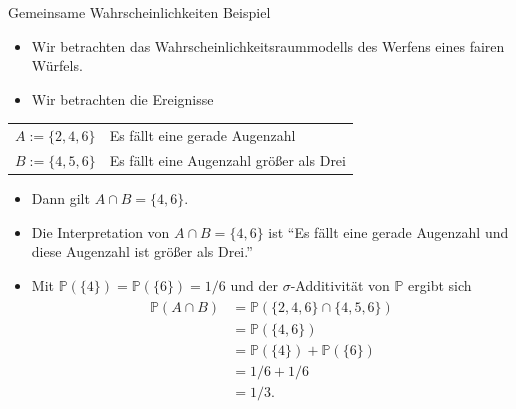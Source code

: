 \documentclass[
  8pt,
  ignorenonframetext,
]{beamer}
\providecommand{\tightlist}{%
  \setlength{\itemsep}{0pt}\setlength{\parskip}{0pt}}
\begin{document}
\begin{frame}{Gemeinsame Wahrscheinlichkeiten}
\protect\hypertarget{gemeinsame-wahrscheinlichkeiten-1}{}
Beispiel

\small

\begin{itemize}
\item
  Wir betrachten das Wahrscheinlichkeitsraummodells des Werfens eines
  fairen Würfels.
\item
  Wir betrachten die Ereignisse
\end{itemize}

\begin{center}
\begin{tabular}{ll}
$A := \{2,4,6\}$ & Es fällt eine gerade Augenzahl              \\
$B := \{4,5,6\}$ & Es fällt eine Augenzahl größer als Drei     \\
\end{tabular}
\end{center}

\begin{itemize}
\item
  Dann gilt \(A \cap B = \{4,6\}\).
\item
  Die Interpretation von \(A \cap B = \{4,6\}\) ist \center ``Es fällt
  eine gerade Augenzahl und diese Augenzahl ist größer als Drei.''
\end{itemize}

\justifying

\begin{itemize}
\tightlist
\item
  Mit \(\mathbb{P}(\{4\}) = \mathbb{P}(\{6\}) = 1/6\) und der
  \(\sigma\)-Additivität von \(\mathbb{P}\) ergibt sich \begin{align}
  \begin{split}
  \mathbb{P}(A \cap B)
  & = \mathbb{P}( \{2,4,6\} \cap \{4,5,6\})       \\
  & = \mathbb{P}( \{4,6\})                        \\
  & = \mathbb{P}(\{4\}) + \mathbb{P}(\{6\})       \\
  & = 1/6 + 1/6                                    \\
  & = 1/3.
  \end{split}
  \end{align}
\end{itemize}
\end{frame}
\end{document}
